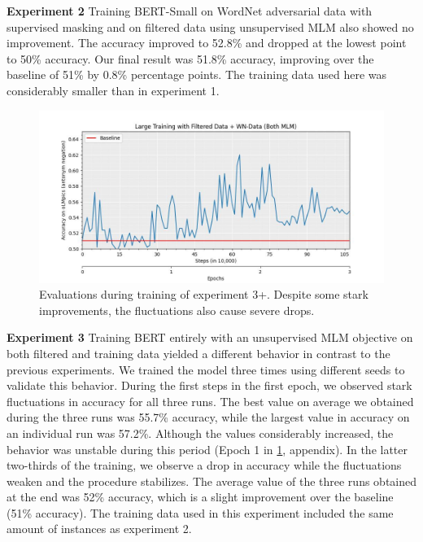 \documentclass{article}
\begin{document}
\textbf{Experiment 2}
Training BERT-Small on WordNet adversarial data with supervised masking and on filtered data using unsupervised MLM also showed no improvement. The accuracy improved to 52.8\% and dropped at the lowest point to 50\% accuracy. Our final result was 51.8\% accuracy, improving over the baseline of 51\% by 0.8\% percentage points. The training data used here was considerably smaller than in experiment 1.

\begin{figure}[!htbp]
    \centering
    \includegraphics[width=\textwidth]{figures/Large_Training_with_Filtered_Data___WN_Data__Both_MLM_.jpg}
    \caption{Evaluations during training of experiment 3+. Despite some stark improvements, the fluctuations also cause severe drops.}
    \label{fig:exp3}
\end{figure}

\textbf{Experiment 3}
Training BERT entirely with an unsupervised MLM objective on both filtered and training data yielded a different behavior in contrast to the previous experiments. We trained the model three times using different seeds to validate this behavior.
During the first steps in the first epoch, we observed stark fluctuations in accuracy for all three runs. The best value on average we obtained during the three runs was 55.7\% accuracy, while the largest value in accuracy on an individual run was 57.2\%. Although the values considerably increased, the behavior was unstable during this period (Epoch 1 in \ref{fig:exp3}, appendix). In the latter two-thirds of the training, we observe a drop in accuracy while the fluctuations weaken and the procedure stabilizes. The average value of the three runs obtained at the end was 52\% accuracy, which is a slight improvement over the baseline (51\% accuracy). The training data used in this experiment included the same amount of instances as experiment 2.
\end{document}
